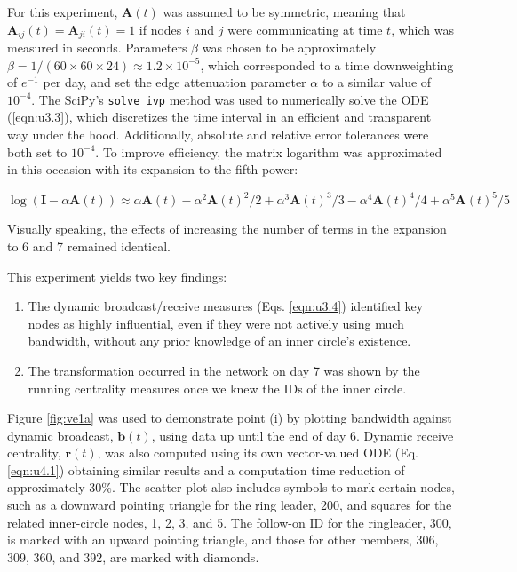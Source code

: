 For this experiment, $\mathbf{A}(t)$ was assumed to be symmetric, meaning that $\mathbf{A}_{ij}(t) = \mathbf{A}_{ji}(t) = 1$ if nodes $i$ and $j$ were communicating at time $t$, which was measured in seconds. Parameters $\beta$ was chosen to be approximately $\beta = 1/(60\times 60 \times 24) \approx 1.2 \times 10^{-5}$, which corresponded to a time downweighting of $e^{-1}$ per day, and set the edge attenuation parameter $\alpha$ to a similar value of $10^{-4}$. The SciPy's \texttt{solve\_ivp} method was used to numerically solve the ODE (\ref{eqn:u3.3}), which discretizes the time interval in an efficient and transparent way under the hood. Additionally, absolute and relative error tolerances were both set to $10^{-4}$. To improve efficiency, the matrix logarithm was approximated in this occasion with its expansion to the fifth power:

$$\log(\mathbf{I} - \alpha \mathbf{A}(t)) \approx \alpha \mathbf{A}(t) - \alpha^2 \mathbf{A}(t)^2/2 + \alpha^3 \mathbf{A}(t)^3/3 - \alpha^4 \mathbf{A}(t)^4/4 + \alpha^5 \mathbf{A}(t)^5/5$$ 

Visually speaking, the effects of increasing the number of terms in the expansion to 6 and 7 remained identical.

This experiment yields two key findings:
\begin{enumerate}[label=(\roman*)]
  \item The dynamic broadcast/receive measures (Eqs. \ref{eqn:u3.4}) identified key nodes as highly influential, even if they were not actively using much bandwidth, without any prior knowledge of an inner circle's existence.
  \item The transformation occurred in the network on day 7 was shown by the running centrality measures once we knew the IDs of the inner circle.
\end{enumerate}

\newpage

Figure \ref{fig:ve1a} was used to demonstrate point (i) by plotting bandwidth against dynamic broadcast, $\mathbf{b}(t)$, using data up until the end of day 6. Dynamic receive centrality, $\mathbf{r}(t)$, was also computed using its own vector-valued ODE (Eq. \ref{eqn:u4.1}) obtaining similar results and a computation time reduction of approximately $30\%$. The scatter plot also includes symbols to mark certain nodes, such as a downward pointing triangle for the ring leader, 200, and squares for the related inner-circle nodes, 1, 2, 3, and 5. The follow-on ID for the ringleader, 300, is marked with an upward pointing triangle, and those for other members, 306, 309, 360, and 392, are marked with diamonds.

